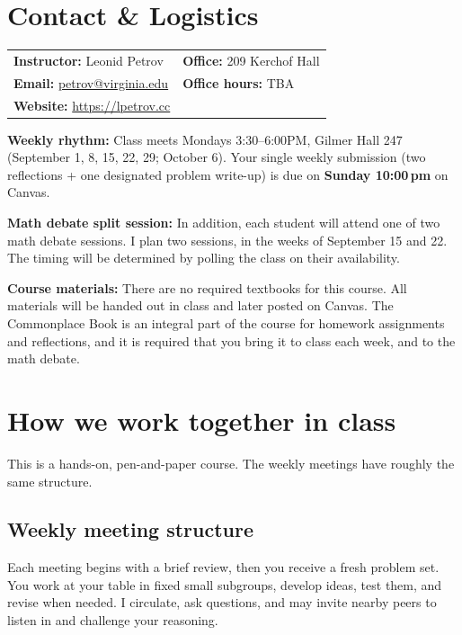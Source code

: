 \documentclass[oneside,11pt]{amsart}
\begin{document}
\newpage
\section{Contact \& Logistics}

\noindent
\begin{tabular}{ll}
\textbf{Instructor:} Leonid Petrov &\qquad \qquad \qquad\textbf{Office:} 209 Kerchof Hall \\
\textbf{Email:} \href{mailto:petrov@virginia.edu}{petrov@virginia.edu} & \qquad \qquad \qquad\textbf{Office hours:} TBA \\
\textbf{Website:} \url{https://lpetrov.cc}
\end{tabular}

\smallskip
\noindent\textbf{Weekly rhythm:} Class meets Mondays
3:30--6:00PM, Gilmer Hall 247
(September 1, 8, 15, 22, 29; October 6).
Your single weekly submission (two reflections + one designated problem write-up) is due on \textbf{Sunday 10:00\,pm} on Canvas.

\smallskip
\noindent
\textbf{Math debate split session:} 
In addition, each student will attend one of two math debate sessions. I plan two
sessions, in the weeks of September 15 and 22. The timing will be 
determined by polling the class on their availability.

\smallskip
\noindent
\textbf{Course materials:}
There are no required textbooks for this course.
All materials will be handed out in class and later posted on Canvas.
The Commonplace Book is an integral part of the course for homework assignments and reflections,
and it is required that you bring it to class each week, and to the math debate.

\section{How we work together in class}

This is a hands-on, pen-and-paper course. 
The weekly meetings have roughly the same structure.

\subsection{Weekly meeting structure}

Each meeting begins with 
a brief review, then you receive
a fresh problem set. You work at your table in fixed small subgroups, develop ideas, test them, and revise when needed. I circulate, ask questions, and may invite nearby peers to listen in and 
challenge your reasoning.
\end{document}
